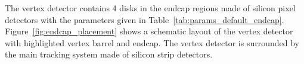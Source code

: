 The vertex detector contains 4 disks in the endcap regions made of silicon pixel detectors with the parameters given in Table~\ref{tab:params_default_endcap}. Figure~\ref{fig:endcap_placement} shows a schematic layout of the vertex detector with highlighted vertex barrel and endcap. The vertex detector is surrounded by the main tracking system made of silicon strip detectors. 
\begin{figure}[H]
  \hspace{-2cm}
\end{figure}
